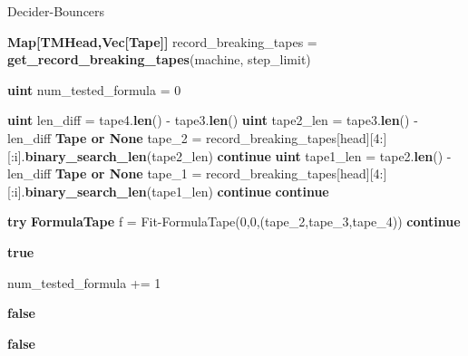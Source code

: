 \begin{algorithm}
    \caption{{\sc Decider-Bouncers}}\label{alg:decider-bouncers}
    \begin{algorithmic}[1]


        \State \textbf{Map[TMHead,Vec[Tape]]} record\_breaking\_tapes = \textbf{get\_record\_breaking\_tapes}(machine, step\_limit)

        \State \textbf{uint} num\_tested\_formula = 0

        \State \textbf{uint} len\_diff = tape4.\textbf{len}() - tape3.\textbf{len}()
        \State \textbf{uint} tape2\_len = tape3.\textbf{len}() - len\_diff
        \State \textbf{Tape or None} tape\_2 = record\_breaking\_tapes[head][4:][:i].\textbf{binary\_search\_len}(tape2\_len)
        \State \textbf{continue}
        \EndIf
        \State
        \State \textbf{uint} tape1\_len = tape2.\textbf{len}() - len\_diff
        \State \textbf{Tape or None} tape\_1 = record\_breaking\_tapes[head][4:][:i].\textbf{binary\_search\_len}(tape1\_len)
        \State \textbf{continue}
        \EndIf
        \State
        \State \textbf{continue}
        \EndIf

        \State

        \State \textbf{try} \textbf{FormulaTape} f = {\sc Fit-FormulaTape}(0,0,(tape\_2,tape\_3,tape\_4))
        \State \textbf{continue}
        \EndIf
        \State

        \State \Return \textbf{true}

        \EndIf

        \State
        \State num\_tested\_formula += 1

        \State
        \State \Return \textbf{false}
        \EndIf


        \EndFor
        \EndFor
        \EndFor
        \State \Return \textbf{false}
        \EndProcedure
    \end{algorithmic}
\end{algorithm}